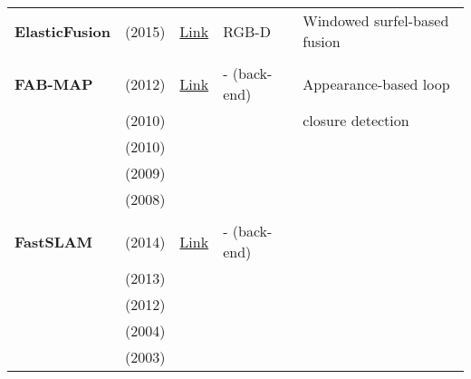 \documentclass[a4paper,12pt]{scrartcl}
\begin{document}
{\begin{longtable}{l|l|l|l|l}
    \textbf{ElasticFusion} & \cite{Whelan2015} (2015)          & {\href{https://github.com/mp3guy/ElasticFusion}{Link}}             & RGB-D                 & Windowed surfel-based fusion\\
                           &                                   &                                                                    &                       &\\
    \textbf{FAB-MAP}       & \cite{Glover2012} (2012)          & {\href{https://github.com/arrenglover/openfabmap}{Link}}           & - (back-end)          & Appearance-based loop\\
                           & \cite{Glover2010} (2010)          &                                                                    &                       & closure detection\\
                           & \cite{Paul2010} (2010)            &                                                                    &                       &\\
                           & \cite{Cummins2009} (2009)         &                                                                    &                       &\\
                           & \cite{Cummins2008} (2008)         &                                                                    &                       &\\
                           &                                   &                                                                    &                       &\\
    \textbf{FastSLAM}      & \cite{Abouzahir2014} (2014)       & {\href{https://github.com/bushuhui/fastslam}{Link}}                & - (back-end)          &\\
                           & \cite{Naminski2013} (2013)        &                                                                    &                       &\\
                           & \cite{Kurt-Yavuz2012} (2012)      &                                                                    &                       &\\
                           & \cite{Thrun2004} (2004)           &                                                                    &                       &\\
                           & \cite{Montemerlo2003} (2003)      &                                                                    &                       &\\

\end{longtable}}
\end{document}
